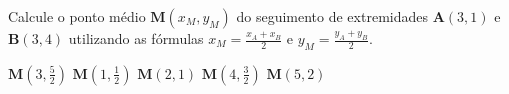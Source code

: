 Calcule o ponto médio $\mathbf{M}(x_M,y_M)$ do seguimento de extremidades $\mathbf{A}(3, 1)$ e $\mathbf{B}(3, 4)$ utilizando as fórmulas $x_M=\frac{x_A+x_B}{2}$ e $y_M=\frac{y_A+y_B}{2}$.

$\mathbf{M}(3, \frac{5}{2})$
$\mathbf{M}(1, \frac{1}{2})$
$\mathbf{M}(2, 1)$
$\mathbf{M}(4, \frac{3}{2})$
$\mathbf{M}(5, 2)$




